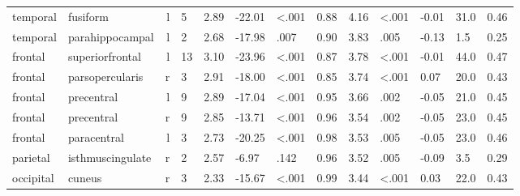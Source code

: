 \documentclass{article}
\begin{document}
\begin{longtable}{llrR{1.5cm}R{1cm}R{1.3cm}R{1cm}R{1cm}R{1.3cm}R{1cm}R{1.8cm}R{1.3cm}R{1.8cm}}
  temporal &                  fusiform &    l &            5 &                  2.89 &           -22.01 &      \textless.001 &                               0.88 &                          4.16 &                   \textless.001 & -0.01 &   31.0 &      0.46 \\
  temporal &           parahippocampal &    l &            2 &                  2.68 &           -17.98 &               .007 &                               0.90 &                          3.83 &                            .005 & -0.13 &    1.5 &      0.25 \\
   frontal &           superiorfrontal &    l &           13 &                  3.10 &           -23.96 &      \textless.001 &                               0.87 &                          3.78 &                   \textless.001 & -0.01 &   44.0 &      0.47 \\
   frontal &           parsopercularis &    r &            3 &                  2.91 &           -18.00 &      \textless.001 &                               0.85 &                          3.74 &                   \textless.001 &  0.07 &   20.0 &      0.43 \\
   frontal &                precentral &    l &            9 &                  2.89 &           -17.04 &      \textless.001 &                               0.95 &                          3.66 &                            .002 & -0.05 &   21.0 &      0.45 \\
   frontal &                precentral &    r &            9 &                  2.85 &           -13.71 &      \textless.001 &                               0.96 &                          3.54 &                            .002 & -0.05 &   23.0 &      0.45 \\
   frontal &               paracentral &    l &            3 &                  2.73 &           -20.25 &      \textless.001 &                               0.98 &                          3.53 &                            .005 & -0.05 &   23.0 &      0.46 \\
  parietal &          isthmuscingulate &    r &            2 &                  2.57 &            -6.97 &               .142 &                               0.96 &                          3.52 &                            .005 & -0.09 &    3.5 &      0.29 \\
 occipital &                    cuneus &    r &            3 &                  2.33 &           -15.67 &      \textless.001 &                               0.99 &                          3.44 &                   \textless.001 &  0.03 &   22.0 &      0.43 \\

\end{longtable}
\end{document}
